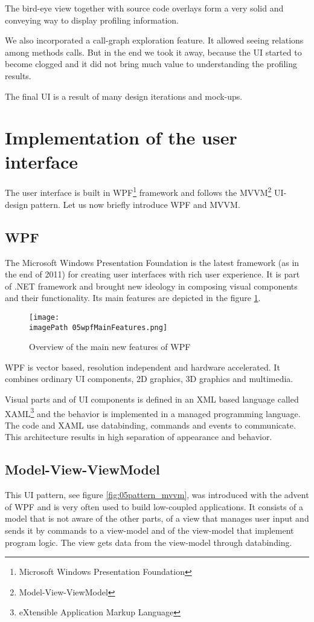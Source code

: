 The bird-eye view together with source code overlays form a very solid and conveying way to display profiling information. 

We also incorporated a call-graph exploration feature. It allowed seeing relations among methods calls. But in the end we took it away, because the UI started to become clogged and it did not bring much value to understanding the profiling results. 

The final UI is a result of many design iterations and mock-ups.

\section{Implementation of the user interface}
The user interface is built in WPF\footnote{Microsoft Windows Presentation Foundation} framework \cite{WPF4Unleashed} and follows the MVVM\footnote{Model-View-ViewModel} \cite{MVVM2011} UI-design pattern. Let us now briefly introduce WPF and MVVM.

\subsection{WPF}
The Microsoft Windows Presentation Foundation is the latest framework (as in the end of 2011) for creating user interfaces with rich user experience. It is part of .NET framework and brought new ideology in composing visual components and their functionality. Its main features are depicted in the figure \ref{fig:05wpfMainFeatures}.

\begin{figure}
	\centering
		\texttt{[image: \\imagePath 05wpfMainFeatures.png]}
		\caption{Overview of the main new features of WPF \cite{WPFpage}}
	\label{fig:05wpfMainFeatures}
\end{figure}

WPF is vector based, resolution independent and hardware accelerated. It combines ordinary UI components, 2D graphics, 3D graphics and multimedia. 

Visual parts and of UI components is defined in an XML based language called \linebreak XAML\footnote{eXtensible Application Markup Language} and the behavior is implemented in a managed programming language. The code and XAML use databinding, commands and events to communicate. This architecture results in high separation of appearance and behavior.

\subsection{Model-View-ViewModel}
This UI pattern, see figure \ref{fig:05pattern_mvvm}, was introduced with the advent of WPF and is very often used to build low-coupled applications. It consists of a model that is not aware of the other parts, of a view that manages user input and sends it by commands to a view-model and of the view-model that implement program logic. The view gets data from the view-model through databinding.

